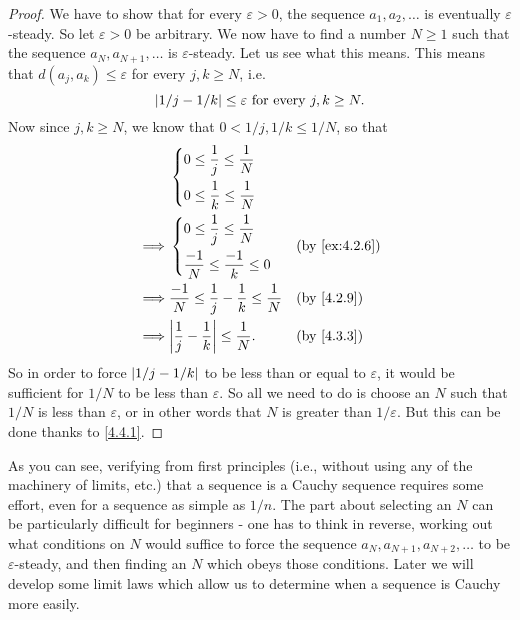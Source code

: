 \begin{proof}
  We have to show that for every \(\varepsilon > 0\), the sequence \(a_1, a_2, \dots\) is eventually \(\varepsilon\)-steady.
  So let \(\varepsilon > 0\) be arbitrary.
  We now have to find a number \(N \geq 1\) such that the sequence \(a_N, a_{N + 1}, \dots\) is \(\varepsilon\)-steady.
  Let us see what this means.
  This means that \(d(a_j, a_k) \leq \varepsilon\) for every \(j, k \geq N\), i.e.
  \[
    \left\lvert1 / j - 1 / k\right\rvert \leq \varepsilon \text{ for every } j, k \geq N.
  \]
  Now since \(j, k \geq N\), we know that \(0 < 1 / j, 1 / k \leq 1 / N\), so that
  \begin{align*}
             &
    \begin{dcases}
      0 \leq \dfrac{1}{j} \leq \dfrac{1}{N} \\
      0 \leq \dfrac{1}{k} \leq \dfrac{1}{N} \\
    \end{dcases}
    \\
    \implies &
    \begin{dcases}
      0 \leq \dfrac{1}{j} \leq \dfrac{1}{N}   \\
      \dfrac{-1}{N} \leq \dfrac{-1}{k} \leq 0 \\
    \end{dcases}
             &                                                                  & \text{(by \cref{ex:4.2.6})}              \\
    \implies & \dfrac{-1}{N} \leq \dfrac{1}{j} - \dfrac{1}{k} \leq \dfrac{1}{N} &                             & \by{4.2.9} \\
    \implies & \abs{\dfrac{1}{j} - \dfrac{1}{k}} \leq \dfrac{1}{N}.             &                             & \by{4.3.3}
  \end{align*}
  So in order to force \(\left\lvert1 / j - 1 / k\right\rvert\) to be less than or equal to \(\varepsilon\), it would be sufficient for \(1 / N\) to be less than \(\varepsilon\).
  So all we need to do is choose an \(N\) such that \(1 / N\) is less than \(\varepsilon\), or in other words that \(N\) is greater than \(1 / \varepsilon\).
  But this can be done thanks to \cref{4.4.1}.
\end{proof}

\begin{note}
  As you can see, verifying from first principles (i.e., without using any of the machinery of limits, etc.) that a sequence is a Cauchy sequence requires some effort, even for a sequence as simple as \(1 / n\).
  The part about selecting an \(N\) can be particularly difficult for beginners
  - one has to think in reverse, working out what conditions on \(N\) would suffice to force the sequence \(a_N, a_{N + 1}, a_{N + 2}, \dots\) to be \(\varepsilon\)-steady, and then finding an \(N\) which obeys those conditions.
  Later we will develop some limit laws which allow us to determine when a sequence is Cauchy more easily.
\end{note}

